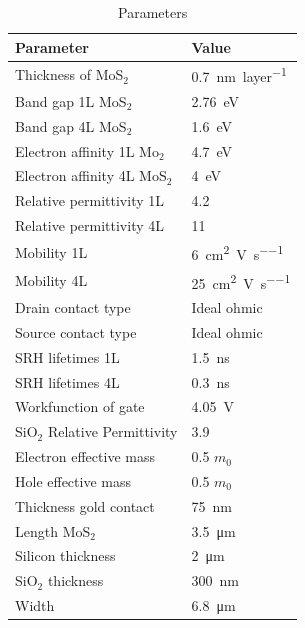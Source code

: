\documentclass[12pt,a4paper,titlepage]{article}
\begin{document}
\begin{table}[H]
	\centering
	\begin{tabular}{l l}
		\toprule
		\textbf{Parameter}	       & \textbf{Value}			 \\
		\midrule
		Thickness of MoS$_2$       & \SI{0.7}{\nano \meter \per layer}              \\
		Band gap 1L MoS$_2$        & \SI{2.76} {\electronvolt}                  \\
		Band gap 4L MoS$_2$        & \SI{1.6} {\electronvolt}                   \\
		Electron affinity 1L Mo$_2$& \SI{4.7} {\electronvolt}                   \\
		Electron affinity 4L MoS$_2$& \SI{4} {\electronvolt}                    \\
		Relative permittivity 1L   & 4.2                      \\
		Relative permittivity 4L   & 11                       \\
		Mobility 1L                & \SI{6} {\square \centi \meter \per \volt \per \second}	  \\
		Mobility 4L                & \SI{25} {\square \centi \meter \per \volt \per \second}  \\
		Drain contact type         & Ideal ohmic              \\
		Source contact type        & Ideal ohmic              \\
		SRH lifetimes 1L           & \SI{1.5} {\nano \second}                   \\
		SRH lifetimes 4L           & \SI{0.3} {\nano \second}                   \\
		Workfunction of gate       & \SI{4.05} {\volt}                   \\
		SiO$_2$ Relative Permittivity & 3.9                   \\
		Electron effective mass    & 0.5 $m_0$            	  \\
		Hole effective mass        & 0.5 $m_0$           	  \\
		Thickness gold contact     & \SI{75} {\nano \meter}                    \\
		Length MoS$_2$             & \SI{3.5} {\micro \meter}              \\
		Silicon thickness          & \SI{2} {\micro \meter}                 \\
		SiO$_2$ thickness          & \SI{300} {\nano \meter}	                  \\
		Width                      & \SI{6.8} {\micro \meter}              \\
		\bottomrule
	\end{tabular}
	\caption{Parameters}
	\label{table:MoS2}
\end{table}
\end{document}
